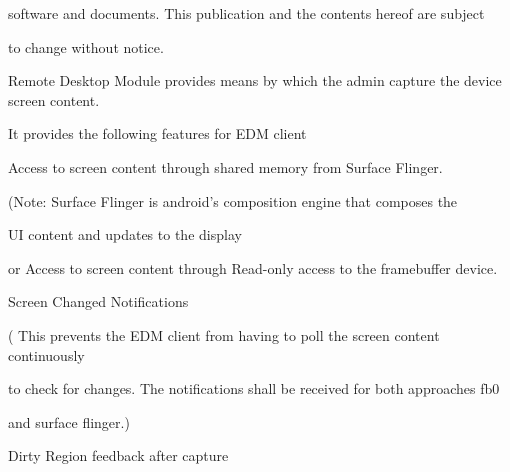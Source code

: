software and documents. \-This publication and the contents hereof are subject

to change without notice.

\-Remote \-Desktop \-Module provides means by which the admin capture the device screen content.

\-It provides the following features for \-E\-D\-M client\par



\begin{DoxyItemize}
\item \-Access to screen content through shared memory from \-Surface \-Flinger. \par

\end{DoxyItemize}

(\-Note\-: \-Surface \-Flinger is android's composition engine that composes the

\-U\-I content and updates to the display\par



\begin{DoxyItemize}
\item or \-Access to screen content through \-Read-\/only access to the framebuffer device.\par

\end{DoxyItemize}


\begin{DoxyItemize}
\item \-Screen \-Changed \-Notifications\par

\end{DoxyItemize}

( \-This prevents the \-E\-D\-M client from having to poll the screen content continuously

to check for changes. \-The notifications shall be received for both approaches fb0

and surface flinger.)\par



\begin{DoxyItemize}
\item \-Dirty \-Region feedback after capture\par

\end{DoxyItemize}

